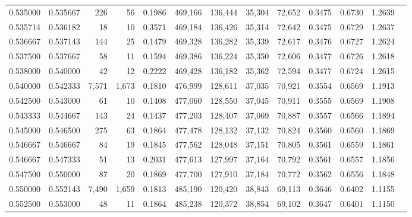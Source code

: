 \begin{tabular}{rrrrrrrrrrrrr}
0.535000 & 0.535667 &    226 &    56 &                                     0.1986 & 469,166 & 136,444 &  35,304 &  72,652 & 0.3475 & 0.6730 & 1.2639 \\
0.535714 & 0.536182 &     18 &    10 &                                     0.3571 & 469,184 & 136,426 &  35,314 &  72,642 & 0.3475 & 0.6729 & 1.2637 \\
0.536667 & 0.537143 &    144 &    25 &                                     0.1479 & 469,328 & 136,282 &  35,339 &  72,617 & 0.3476 & 0.6727 & 1.2624 \\
0.537500 & 0.537667 &     58 &    11 &                                     0.1594 & 469,386 & 136,224 &  35,350 &  72,606 & 0.3477 & 0.6726 & 1.2618 \\
0.538000 & 0.540000 &     42 &    12 &                                     0.2222 & 469,428 & 136,182 &  35,362 &  72,594 & 0.3477 & 0.6724 & 1.2615 \\
0.540000 & 0.542333 &  7,571 & 1,673 &                                     0.1810 & 476,999 & 128,611 &  37,035 &  70,921 & 0.3554 & 0.6569 & 1.1913 \\
0.542500 & 0.543000 &     61 &    10 &                                     0.1408 & 477,060 & 128,550 &  37,045 &  70,911 & 0.3555 & 0.6569 & 1.1908 \\
0.543333 & 0.544667 &    143 &    24 &                                     0.1437 & 477,203 & 128,407 &  37,069 &  70,887 & 0.3557 & 0.6566 & 1.1894 \\
0.545000 & 0.546500 &    275 &    63 &                                     0.1864 & 477,478 & 128,132 &  37,132 &  70,824 & 0.3560 & 0.6560 & 1.1869 \\
0.546667 & 0.546667 &     84 &    19 &                                     0.1845 & 477,562 & 128,048 &  37,151 &  70,805 & 0.3561 & 0.6559 & 1.1861 \\
0.546667 & 0.547333 &     51 &    13 &                                     0.2031 & 477,613 & 127,997 &  37,164 &  70,792 & 0.3561 & 0.6557 & 1.1856 \\
0.547500 & 0.550000 &     87 &    20 &                                     0.1869 & 477,700 & 127,910 &  37,184 &  70,772 & 0.3562 & 0.6556 & 1.1848 \\
0.550000 & 0.552143 &  7,490 & 1,659 &                                     0.1813 & 485,190 & 120,420 &  38,843 &  69,113 & 0.3646 & 0.6402 & 1.1155 \\
0.552500 & 0.553000 &     48 &    11 &                                     0.1864 & 485,238 & 120,372 &  38,854 &  69,102 & 0.3647 & 0.6401 & 1.1150 \\

\end{tabular}

